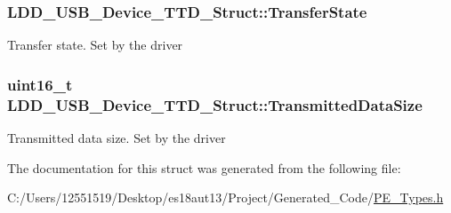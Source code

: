 \subsubsection[{Transfer\+State}]{ L\+D\+D\+\_\+\+U\+S\+B\+\_\+\+Device\+\_\+\+T\+T\+D\+\_\+\+Struct\+::\+Transfer\+State}\label{struct_l_d_d___u_s_b___device___t_t_d___struct_aca23e3743f56dc73206b79f885e9130f}
Transfer state. Set by the driver \hypertarget{struct_l_d_d___u_s_b___device___t_t_d___struct_aeffbf1300fce5fc9ebf98f5760a96d38}{}
\subsubsection[{Transmitted\+Data\+Size}]{\setlength{\rightskip}{0pt plus 5cm}uint16\+\_\+t L\+D\+D\+\_\+\+U\+S\+B\+\_\+\+Device\+\_\+\+T\+T\+D\+\_\+\+Struct\+::\+Transmitted\+Data\+Size}\label{struct_l_d_d___u_s_b___device___t_t_d___struct_aeffbf1300fce5fc9ebf98f5760a96d38}
Transmitted data size. Set by the driver 

The documentation for this struct was generated from the following file\+:\begin{DoxyCompactItemize}
\item 
C\+:/\+Users/12551519/\+Desktop/es18aut13/\+Project/\+Generated\+\_\+\+Code/\hyperlink{_p_e___types_8h}{P\+E\+\_\+\+Types.\+h}\end{DoxyCompactItemize}
